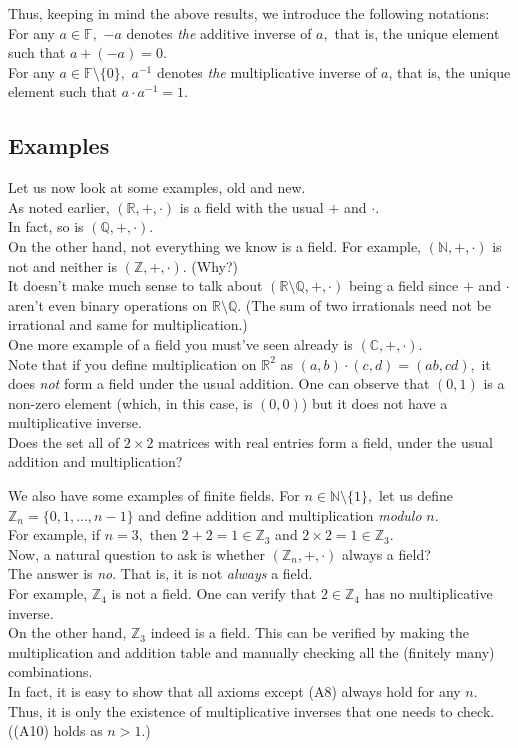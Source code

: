 \documentclass[12pt]{article}
\begin{document}
Thus, keeping in mind the above results, we introduce the following notations:\\
For any $a \in \mathbb{F},$ $-a$ denotes \emph{the} additive inverse of $a,$ that is, the unique element such that $a + (-a) = 0.$\\
For any $a \in \mathbb{F}\setminus\{0\},$ $a^{-1}$ denotes \emph{the} multiplicative inverse of $a$, that is, the unique element such that $a \cdot a^{-1} = 1.$

\subsection{Examples}
Let us now look at some examples, old and new.\\
As noted earlier, $(\mathbb{R}, +, \cdot)$ is a field with the usual $+$ and $\cdot.$\\
In fact, so is $(\mathbb{Q}, +, \cdot).$\\
On the other hand, not everything we know is a field. For example, $(\mathbb{N}, +, \cdot)$ is not and neither is $(\mathbb{Z}, +, \cdot).$ (Why?)\\
It doesn't make much sense to talk about $(\mathbb{R}\setminus\mathbb{Q}, +, \cdot)$ being a field since $+$ and $\cdot$ aren't even binary operations on $\mathbb{R}\setminus\mathbb{Q}.$ (The sum of two irrationals need not be irrational and same for multiplication.)\\
One more example of a field you must've seen already is $(\mathbb{C}, +, \cdot).$\\
Note that if you define multiplication on $\mathbb{R}^2$ as $(a, b)\cdot(c, d) = (ab, cd),$ it does \emph{not} form a field under the usual addition. One can observe that $(0, 1)$ is a non-zero element (which, in this case, is $(0, 0)$) but it does not have a multiplicative inverse. \\
Does the set all of $2\times2$ matrices with real entries form a field, under the usual addition and multiplication?

We also have some examples of finite fields. For $n \in \mathbb{N}\setminus\{1\},$ let us define $\mathbb{Z}_n = \{0, 1, \ldots, n-1\}$ and define addition and multiplication \emph{modulo} $n.$\\
For example, if $n = 3,$ then $2 + 2 = 1 \in \mathbb{Z}_3$ and $2\times 2 = 1 \in \mathbb{Z}_3.$\\
Now, a natural question to ask is whether $(\mathbb{Z}_n, +, \cdot)$ always a field?\\
The answer is \emph{no}. That is, it is not \emph{always} a field.\\
For example, $\mathbb{Z}_4$ is not a field. One can verify that $2 \in \mathbb{Z}_4$ has no multiplicative inverse.\\
On the other hand, $\mathbb{Z}_3$ indeed is a field. This can be verified by making the multiplication and addition table and manually checking all the (finitely many) combinations.\\
In fact, it is easy to show that all axioms except (A8) always hold for any $n.$ Thus, it is only the existence of multiplicative inverses that one needs to check. ((A10) holds as $n > 1$.)
\end{document}
